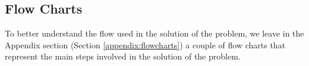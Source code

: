 \subsection{Flow Charts}
\label{sec:flow_charts}

To better understand the flow used in the solution of the problem, we leave in the Appendix section (Section \ref{appendix:flowcharts}) a couple of flow charts that represent the main steps involved in the solution of the problem.

